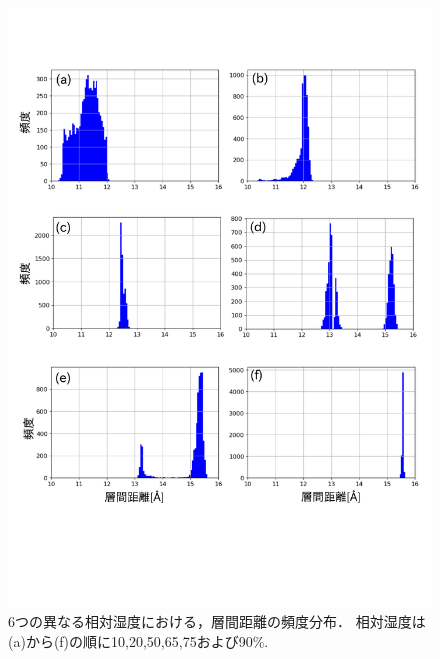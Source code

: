 \begin{figure}[h]
	\begin{center}
	\includegraphics[width=1.0\linewidth]{Figs/fig5.pdf} 
	\end{center}
	\caption{
		6つの異なる相対湿度における，層間距離の頻度分布．
		相対湿度は(a)から(f)の順に10,20,50,65,75および90$\%$. 
	} 
	\label{fig:fig5}
\end{figure}
